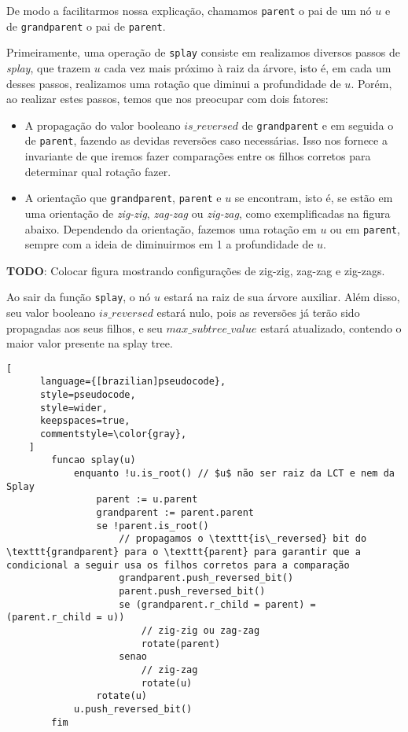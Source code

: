 De modo a facilitarmos nossa explicação, chamamos \texttt{parent} o pai de um nó $u$ e de \texttt{grandparent} o pai de \texttt{parent}.

Primeiramente, uma operação de \texttt{splay} consiste em realizamos diversos passos de \emph{splay}, que trazem $u$ cada vez mais próximo à raiz da árvore, isto é, em cada um desses passos, realizamos uma rotação que diminui a profundidade de $u$. Porém, ao realizar estes passos, temos que nos preocupar com dois fatores:

\begin{itemize}
    \item A propagação do valor booleano $is\_reversed$ de \texttt{grandparent} e em seguida o de \texttt{parent}, fazendo as devidas reversões caso necessárias. Isso nos fornece a invariante de que iremos fazer comparações entre os filhos corretos para determinar qual rotação fazer.
    \item A orientação que \texttt{grandparent}, \texttt{parent} e $u$ se encontram, isto é, se estão em uma orientação de \textit{zig-zig}, \textit{zag-zag} ou \textit{zig-zag}, como exemplificadas na figura abaixo. Dependendo da orientação, fazemos uma rotação em $u$ ou em \texttt{parent}, sempre com a ideia de diminuirmos em 1 a profundidade de $u$.
\end{itemize}

\begin{center}
    \textbf{TODO}: Colocar figura mostrando configurações de zig-zig, zag-zag e zig-zags.
\end{center}

Ao sair da função \texttt{splay}, o nó $u$ estará na raiz de sua árvore auxiliar. Além disso, seu valor booleano $is\_reversed$ estará nulo, pois as reversões já terão sido propagadas aos seus filhos, e seu $max\_subtree\_value$ estará atualizado, contendo o maior valor presente na splay tree.

\begin{programruledcaption}{\label{splay:splay}}
    \begin{lstlisting}[
      language={[brazilian]pseudocode},
      style=pseudocode,
      style=wider,
      keepspaces=true,
      commentstyle=\color{gray},
    ]
        funcao splay(u)
            enquanto !u.is_root() // $u$ não ser raiz da LCT e nem da Splay
                parent := u.parent
                grandparent := parent.parent
                se !parent.is_root()
                    // propagamos o \texttt{is\_reversed} bit do \texttt{grandparent} para o \texttt{parent} para garantir que a condicional a seguir usa os filhos corretos para a comparação
                    grandparent.push_reversed_bit()
                    parent.push_reversed_bit()
                    se (grandparent.r_child = parent) = (parent.r_child = u))
                        // zig-zig ou zag-zag
                        rotate(parent)
                    senao
                        // zig-zag
                        rotate(u)
                rotate(u)
            u.push_reversed_bit()
        fim
    \end{lstlisting}
\end{programruledcaption}

